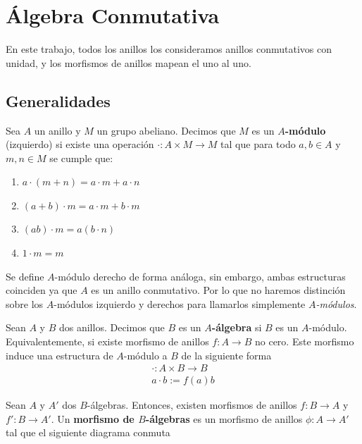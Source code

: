 \chapter{Álgebra Conmutativa}
En este trabajo, todos los anillos los consideramos anillos conmutativos con unidad, y los morfismos de anillos mapean el uno al uno.

\section{Generalidades}

\begin{definition}[$A$-módulo]
    Sea $A$ un anillo y $M$ un grupo abeliano. Decimos que $M$ es un \textbf{$A$-módulo} (izquierdo) si existe una operación $\cdot:A\times M\to M$ tal que para todo $a,b\in A$ y $m,n\in M$ se cumple que: 
    \begin{enumerate}
        \item $a\cdot (m+n)=a\cdot m+a\cdot n$
        \item $(a+b)\cdot m=a\cdot m + b\cdot m$
        \item $(ab)\cdot m=a(b\cdot n)$
        \item $1\cdot m=m$
    \end{enumerate}
\end{definition}

Se define $A$-módulo derecho de forma análoga, sin embargo, ambas estructuras coinciden ya que $A$ es un anillo conmutativo. Por lo que no haremos distinción sobre los $A$-módulos izquierdo y derechos para llamarlos simplemente \textit{$A$-módulos}.

\begin{definition}[$A$-álgebra]
    Sean $A$ y $B$ dos anillos. Decimos que $B$ es un \textbf{$A$-álgebra} si $B$ es un $A$-módulo. Equivalentemente, si existe 
    morfismo de anillos $f:A\to B$ no cero. Este morfismo induce una estructura de $A$-módulo a $B$ de la siguiente forma
    \begin{align*}
        \cdot:A\times B\to B\\
        a\cdot b:=f(a)b
    \end{align*}
\end{definition}

\begin{definition}
    Sean $A$ y $A'$ dos $B$-álgebras. Entonces, existen morfismos de anillos $f:B\to A$ y $f':B\to A'$. Un \textbf{morfismo de $B$-álgebras} es un morfismo de anillos $\phi:A\to A'$ tal que el siguiente diagrama conmuta
    \begin{center}
    \end{center}
\end{definition}

